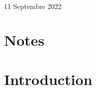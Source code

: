 \documentclass{article}
\begin{document}
\begin{titlepage}
\begin{minipage}{0.4\textwidth}
\begin{flushleft}
\end{flushleft}


\end{minipage}\\[2cm]

{\large 11 Septembre 2022}\\[2cm] %

\vfill %

\end{titlepage}

\newpage

\tableofcontents

\newpage
{}

\section{Notes}


\section{Introduction}


\newpage
\nocite{*}
\printbibliography



\begin{appendix}
\end{appendix}
\end{document}
